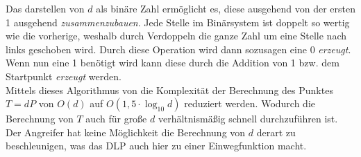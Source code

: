 Das darstellen von $d$ als binäre Zahl ermöglicht es, diese ausgehend von der ersten 1 ausgehend \textit{zusammenzubauen}. Jede Stelle im Binärsystem ist doppelt so wertig wie die vorherige, weshalb durch Verdoppeln die ganze Zahl um eine Stelle nach links geschoben wird. Durch diese Operation wird dann sozusagen eine 0 \textit{erzeugt}. Wenn nun eine 1 benötigt wird kann diese durch die Addition von 1 bzw. dem Startpunkt \textit{erzeugt} werden.\\

Mittels dieses Algorithmus von die Komplexität der Berechnung des Punktes $T = dP$ von $O(d)$ auf $O(1,5 \cdot \log_{10}d)$ reduziert werden. Wodurch die Berechnung von $T$ auch für große $d$ verhältnismäßig schnell durchzuführen ist. Der Angreifer hat keine Möglichkeit die Berechnung von $d$ derart zu beschleunigen, was das DLP auch hier zu einer Einwegfunktion macht.\cite[280-284]{Paar.2016}




































